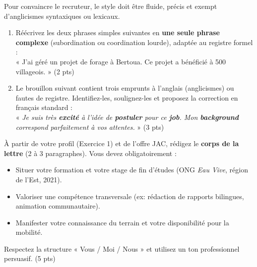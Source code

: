 \documentclass[11pt]{article}
\begin{document}
\begin{exercice}
Pour convaincre le recruteur, le style doit être fluide, précis et exempt d'anglicismes syntaxiques ou lexicaux.

\begin{enumerate}
    \item Réécrivez les deux phrases simples suivantes en \textbf{une seule phrase complexe} (subordination ou coordination lourde), adaptée au registre formel :\\
    « J'ai géré un projet de forage à Bertoua. Ce projet a bénéficié à 500 villageois. » \hfill (2 pts)
    \item Le brouillon suivant contient trois emprunts à l'anglais (anglicismes) ou fautes de registre. Identifiez-les, soulignez-les et proposez la correction en français standard :\\
    « \textit{Je suis très \textbf{excité} à l'idée de \textbf{postuler} pour ce \textbf{job}. Mon \textbf{background} correspond parfaitement à vos attentes.} » \hfill (3 pts)
\end{enumerate}
\end{exercice}

\begin{exercice}
À partir de votre profil (Exercice 1) et de l'offre JAC, rédigez le \textbf{corps de la lettre} (2 à 3 paragraphes). Vous devez obligatoirement :
\begin{itemize}
    \item Situer votre formation et votre stage de fin d'études (ONG \textit{Eau Vive}, région de l'Est, 2021).
    \item Valoriser une compétence transversale (ex: rédaction de rapports bilingues, animation communautaire).
    \item Manifester votre connaissance du terrain et votre disponibilité pour la mobilité.
\end{itemize}
Respectez la structure « Vous / Moi / Nous » et utilisez un ton professionnel persuasif. \hfill (5 pts)
\end{exercice}
\end{document}
